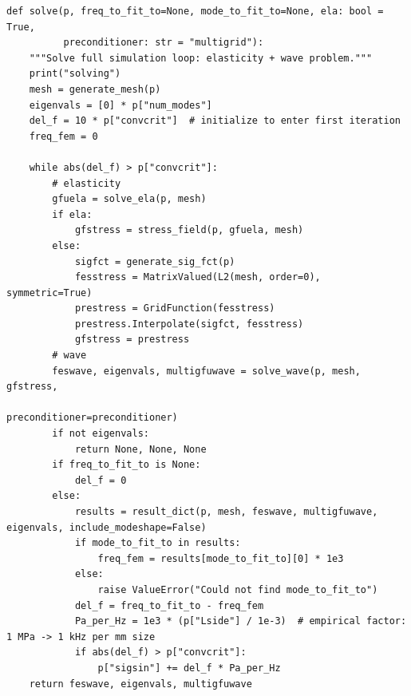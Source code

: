 \begin{verbatim}
def solve(p, freq_to_fit_to=None, mode_to_fit_to=None, ela: bool = True,
          preconditioner: str = "multigrid"):
    """Solve full simulation loop: elasticity + wave problem."""
    print("solving")
    mesh = generate_mesh(p)
    eigenvals = [0] * p["num_modes"]
    del_f = 10 * p["convcrit"]  # initialize to enter first iteration
    freq_fem = 0

    while abs(del_f) > p["convcrit"]:
        # elasticity
        gfuela = solve_ela(p, mesh)
        if ela:
            gfstress = stress_field(p, gfuela, mesh)
        else:
            sigfct = generate_sig_fct(p)
            fesstress = MatrixValued(L2(mesh, order=0), symmetric=True)
            prestress = GridFunction(fesstress)
            prestress.Interpolate(sigfct, fesstress)
            gfstress = prestress
        # wave
        feswave, eigenvals, multigfuwave = solve_wave(p, mesh, gfstress,
                                                      preconditioner=preconditioner)
        if not eigenvals:
            return None, None, None
        if freq_to_fit_to is None:
            del_f = 0
        else:
            results = result_dict(p, mesh, feswave, multigfuwave, eigenvals, include_modeshape=False)
            if mode_to_fit_to in results:
                freq_fem = results[mode_to_fit_to][0] * 1e3
            else:
                raise ValueError("Could not find mode_to_fit_to")
            del_f = freq_to_fit_to - freq_fem
            Pa_per_Hz = 1e3 * (p["Lside"] / 1e-3)  # empirical factor: 1 MPa -> 1 kHz per mm size
            if abs(del_f) > p["convcrit"]:
                p["sigsin"] += del_f * Pa_per_Hz
    return feswave, eigenvals, multigfuwave
\end{verbatim}